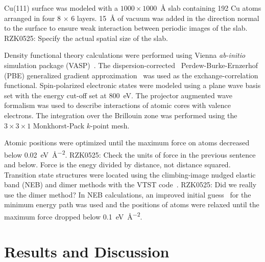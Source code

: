 \documentclass[%
 reprint,
 amsmath,amssymb,
 aps,
prb,
floatfix,
]{revtex4-2}
\newcommand{\lock}{\color{red}}
\newcommand{\lock}{\color{black}}
\newcommand{\comm}{\color{Purple}} %
\begin{document}
{\lock

Cu(111) surface was modeled with a $1000 \times 1000$~\si{\angstrom} slab containing 192 Cu atoms arranged in four 8 $\times$ 6 layers. \SI{15}{\angstrom} of vacuum was added in the direction normal to the surface to ensure weak interaction between periodic images of the slab. {\comm RZK0525: Specify the actual spatial size of the slab.}

Density functional theory calculations were performed using Vienna \emph{ab-initio} simulation package (VASP)~\cite{RZK}. The dispersion-corrected~\cite{RZK-DFT-D3} Perdew-Burke-Ernzerhof (PBE) generalized gradient approximation~\cite{RZK} was used as the exchange-correlation functional. Spin-polarized electronic states were modeled using a plane wave basis set with the energy cut-off set at \SI{800}{\electronvolt}. The projector augmented wave formalism was used to describe interactions of atomic cores with valence electrons. The integration over the Brillouin zone was performed using the $3\times 3 \times1$ Monkhorst-Pack $k$-point mesh. 

Atomic positions were optimized until the maximum force on atoms decreased below \SI{0.02}{\electronvolt\per\square\angstrom}. 
{\comm RZK0525: Check the units of force in the previous sentence and below. Force is the enegy divided by distance, not distance squared.}
%
Transition state structures were located using the climbing-image nudged elastic band (NEB) and dimer methods with the VTST code~\cite{ullmann_59}. {\comm RZK0525: Did we really use the dimer method?}
%
In NEB calculations, an improved initial guess~\cite{ullmann_60, ullmann_99} for the minimum energy path was used and the positions of atoms were relaxed until the maximum force dropped below \SI{0.1}{\electronvolt\per\square\angstrom}.


}

\section{Results and Discussion}

\end{document}
